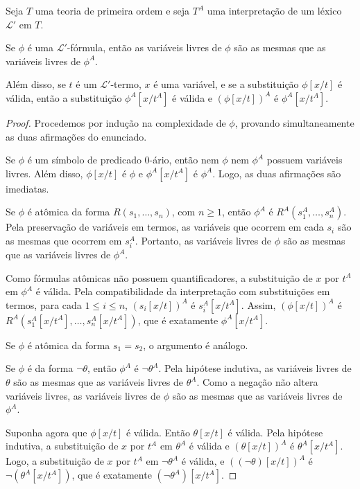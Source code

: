 \begin{metalemma}\label{mlem:substituicaoEInterpretacao}
    Seja $T$ uma teoria de primeira ordem e seja $T^A$ uma interpretação de um léxico $\mathcal L'$ em $T$.

    Se $\phi$ é uma $\mathcal L'$-fórmula, então as variáveis livres de $\phi$ são as mesmas que as variáveis livres de $\phi^A$.

    Além disso, se $t$ é um $\mathcal L'$-termo, $x$ é uma variável, e se a substituição $\phi[x/t]$ é válida, então a substituição $\phi^A[x/t^A]$ é válida e $(\phi[x/t])^A$ é $\phi^A[x/t^A]$.
\end{metalemma}
\begin{proof}
    Procedemos por indução na complexidade de $\phi$, provando simultaneamente as duas afirmações do enunciado.

    Se $\phi$ é um símbolo de predicado $0$-ário, então nem $\phi$ nem $\phi^A$ possuem variáveis livres.
    Além disso, $\phi[x/t]$ é $\phi$ e $\phi^A[x/t^A]$ é $\phi^A$.
    Logo, as duas afirmações são imediatas.

    Se $\phi$ é atômica da forma $R(s_1,\dots,s_n)$, com $n\geq 1$, então $\phi^A$ é $R^A(s_1^A,\dots,s_n^A)$.
    Pela preservação de variáveis em termos, as variáveis que ocorrem em cada $s_i$ são as mesmas que ocorrem em $s_i^A$.
    Portanto, as variáveis livres de $\phi$ são as mesmas que as variáveis livres de $\phi^A$.

    Como fórmulas atômicas não possuem quantificadores, a substituição de $x$ por $t^A$ em $\phi^A$ é válida.
    Pela compatibilidade da interpretação com substituições em termos, para cada $1\leq i\leq n$, $(s_i[x/t])^A$ é $s_i^A[x/t^A]$.
    Assim, $(\phi[x/t])^A$ é $R^A(s_1^A[x/t^A],\dots,s_n^A[x/t^A])$, que é exatamente $\phi^A[x/t^A]$.
  
    Se $\phi$ é atômica da forma $s_1=s_2$, o argumento é análogo.

    Se $\phi$ é da forma $\neg\theta$, então $\phi^A$ é $\neg\theta^A$.
    Pela hipótese indutiva, as variáveis livres de $\theta$ são as mesmas que as variáveis livres de $\theta^A$.
    Como a negação não altera variáveis livres, as variáveis livres de $\phi$ são as mesmas que as variáveis livres de $\phi^A$.

    Suponha agora que $\phi[x/t]$ é válida.
    Então $\theta[x/t]$ é válida.
    Pela hipótese indutiva, a substituição de $x$ por $t^A$ em $\theta^A$ é válida e $(\theta[x/t])^A$ é $\theta^A[x/t^A]$.
    Logo, a substituição de $x$ por $t^A$ em $\neg\theta^A$ é válida, e $((\neg\theta)[x/t])^A$ é $\neg(\theta^A[x/t^A])$,
    que é exatamente $(\neg\theta^A)[x/t^A]$.


\end{proof}
